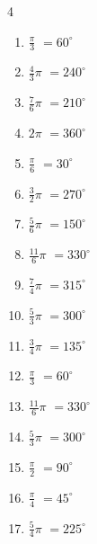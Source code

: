 \begin{multicols}{4}
\begin{enumerate}
  \item $\displaystyle \frac{\pi}{3}$
        $\displaystyle =60^{\circ}$

  \item $\displaystyle \frac{4}{3}\pi$
        $\displaystyle =240^{\circ}$

  \item $\displaystyle \frac{7}{6}\pi$
        $\displaystyle =210^{\circ}$

  \item $\displaystyle 2\pi$
        $\displaystyle =360^{\circ}$

  \item $\displaystyle \frac{\pi}{6}$
        $\displaystyle =30^{\circ}$

  \item $\displaystyle \frac{3}{2}\pi$
        $\displaystyle =270^{\circ}$

  \item $\displaystyle \frac{5}{6}\pi$
        $\displaystyle =150^{\circ}$

  \item $\displaystyle \frac{11}{6}\pi$
        $\displaystyle =330^{\circ}$

  \item $\displaystyle \frac{7}{4}\pi$
        $\displaystyle =315^{\circ}$

\columnbreak %

  \item $\displaystyle \frac{5}{3}\pi$
        $\displaystyle =300^{\circ}$

  \item $\displaystyle \frac{3}{4}\pi$
        $\displaystyle =135^{\circ}$

  \item $\displaystyle \frac{\pi}{3}$
        $\displaystyle =60^{\circ}$

  \item $\displaystyle \frac{11}{6}\pi$
        $\displaystyle =330^{\circ}$

  \item $\displaystyle \frac{5}{3}\pi$
        $\displaystyle =300^{\circ}$

  \item $\displaystyle \frac{\pi}{2}$
        $\displaystyle =90^{\circ}$

  \item $\displaystyle \frac{\pi}{4}$
        $\displaystyle =45^{\circ}$

  \item $\displaystyle \frac{5}{4}\pi$
        $\displaystyle =225^{\circ}$


\end{enumerate}
\end{multicols}
